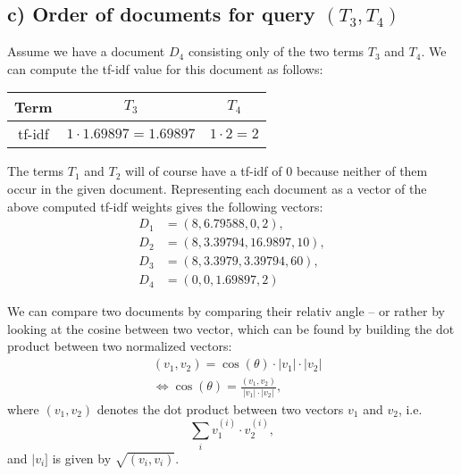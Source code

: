 \documentclass[a4paper]{article}
\begin{document}
\subsection*{c) Order of documents for query $(T_3,T_4)$}
Assume we have a document $D_4$ consisting only of the two terms $T_3$ and $T_4$. We can compute the tf-idf value for this document as follows: 

\begin{table}[h]
\begin{tabular}{| c | c | c |}
\hline
Term & $T_3$ & $T_4$ \\ \hline
tf-idf & $1 \cdot 1.69897 = 1.69897$ & $1 \cdot  2 = 2$\\ \hline 
\end{tabular}
\end{table}

\vspace{5mm}
\noindent The terms $T_1$ and $T_2$ will of course have a tf-idf of $0$ because neither of them occur in the given document. Representing each document as a vector of the above computed tf-idf weights gives the following vectors:
\begin{align*}
 D_1 &= (8, 6.79588, 0, 2), \\
 D_2 &= (8, 3.39794, 16.9897, 10 ), \\
 D_3 &= (8, 3.3979,3.39794, 60), \\
 D_4 &= (0,0,1.69897, 2)
\end{align*}

\noindent We can compare two documents by comparing their relativ angle -- or rather by looking at the cosine between two vector, which can be found by building the dot product between two normalized vectors:
\begin{align*}
 &(v_1,v_2) = \cos(\theta) \cdot |v_1| \cdot |v_2| \\
 &\Longleftrightarrow \cos(\theta) = \frac{(v_1,v_2)}{|v_1| \cdot |v_2|},
\end{align*}
where $(v_1,v_2)$ denotes the dot product between two vectors $v_1$ and $v_2$, i.e. 
$$\sum_i v_1^{(i)}\cdot v_2^{(i)},$$
and $|v_i]$ is given by $\sqrt{(v_i,v_i)}$.
\end{document}
